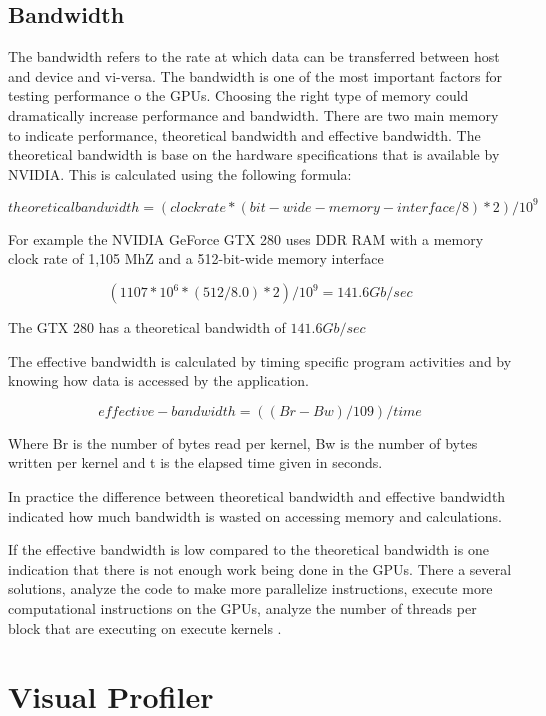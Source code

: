\subsection{Bandwidth}

The bandwidth refers to the rate at which data can be transferred between host and device and vi-versa. The bandwidth is one of the most important factors for testing performance o the GPUs.  Choosing the right type of memory could dramatically increase performance and bandwidth.  There are two main memory to indicate performance, theoretical bandwidth and effective bandwidth.
The theoretical bandwidth is base on the hardware specifications that is available by NVIDIA. This is calculated using the following formula:

$$ theoretical bandwidth = (clock rate * (bit-wide-memory-interface / 8 )*2) / 10^9 $$

For example the NVIDIA GeForce GTX 280 uses DDR RAM with a memory clock rate of 1,105 MhZ and a 512-bit-wide memory interface

$$ (1107 * 10^6 * (512/8.0) *2 )/10^9 = 141.6 Gb /sec$$

The GTX 280 has a theoretical bandwidth of $141.6Gb/sec$

The effective bandwidth is calculated by timing  specific program activities and by knowing how data is accessed by the application. \cite{practices}

$$effective-bandwidth = ((Br - Bw) / 109 )/time$$

Where Br is the number of bytes read per kernel, Bw is the number of bytes written per kernel and  t is the elapsed time given in seconds.  \cite{fortran}

In practice the difference between theoretical bandwidth and effective bandwidth indicated how much bandwidth is wasted on accessing memory and calculations.

If the effective bandwidth is low compared to the theoretical bandwidth is one indication that there is not enough work being done in the GPUs. There a several solutions, analyze the code to make  more parallelize instructions, execute more computational instructions on the GPUs, analyze the number of threads per block that are executing on execute kernels .


\section{Visual Profiler}

